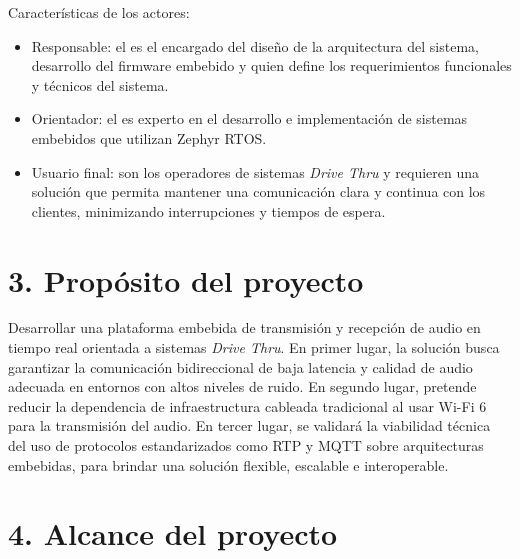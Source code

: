 \documentclass[
11pt, %
]{charter}
\newcommand{\driveThru}{\textit{Drive Thru}}
\begin{document}
Características de los actores:
\begin{itemize}
	\item Responsable: el \authorname{} es el encargado del diseño de la arquitectura del sistema, desarrollo del firmware embebido y quien define los requerimientos funcionales y técnicos del sistema.
	\item Orientador: el \supname{} es experto en el desarrollo e implementación de sistemas embebidos que utilizan Zephyr RTOS.
	\item Usuario final: son los operadores de sistemas \driveThru{} y requieren una solución que permita mantener una comunicación clara y continua con los clientes, minimizando interrupciones y tiempos de espera.
\end{itemize}

\section{3. Propósito del proyecto}
\label{sec:proposito}

Desarrollar una plataforma embebida de transmisión y recepción de audio en tiempo real orientada a sistemas \driveThru{}. En primer lugar, la solución busca garantizar la comunicación bidireccional de baja latencia y calidad de audio adecuada en entornos con altos niveles de ruido. En segundo lugar, pretende reducir la dependencia de infraestructura cableada tradicional al usar Wi-Fi 6 para la transmisión del audio. En tercer lugar, se validará la viabilidad técnica del uso de protocolos estandarizados como RTP y MQTT sobre arquitecturas embebidas, para brindar una solución flexible, escalable e interoperable.

\section{4. Alcance del proyecto}
\label{sec:alcance}
\end{document}
